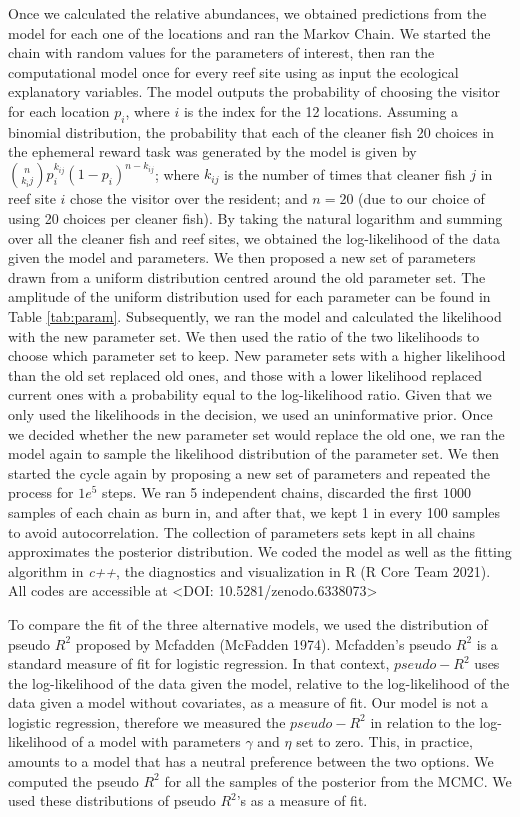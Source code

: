 \documentclass[
  12pt,
]{article}
\begin{document}
Once we calculated the relative abundances, we obtained predictions from
the model for each one of the locations and ran the Markov Chain. We
started the chain with random values for the parameters of interest,
then ran the computational model once for every reef site using as input
the ecological explanatory variables. The model outputs the probability
of choosing the visitor for each location \(p_i\), where \(i\) is the
index for the 12 locations. Assuming a binomial distribution, the
probability that each of the cleaner fish 20 choices in the ephemeral
reward task was generated by the model is given by
\(\binom{n}{k_ij}p^{k_{ij}}_i (1-p_i)^{n-k_{ij}}\); where \(k_{ij}\) is
the number of times that cleaner fish \(j\) in reef site \(i\) chose the
visitor over the resident; and \(n=20\) (due to our choice of using 20
choices per cleaner fish). By taking the natural logarithm and summing
over all the cleaner fish and reef sites, we obtained the log-likelihood
of the data given the model and parameters. We then proposed a new set
of parameters drawn from a uniform distribution centred around the old
parameter set. The amplitude of the uniform distribution used for each
parameter can be found in Table \ref{tab:param}. Subsequently, we ran
the model and calculated the likelihood with the new parameter set. We
then used the ratio of the two likelihoods to choose which parameter set
to keep. New parameter sets with a higher likelihood than the old set
replaced old ones, and those with a lower likelihood replaced current
ones with a probability equal to the log-likelihood ratio. Given that we
only used the likelihoods in the decision, we used an uninformative
prior. Once we decided whether the new parameter set would replace the
old one, we ran the model again to sample the likelihood distribution of
the parameter set. We then started the cycle again by proposing a new
set of parameters and repeated the process for \(1e^5\) steps. We ran 5
independent chains, discarded the first \(1000\) samples of each chain
as burn in, and after that, we kept 1 in every 100 samples to avoid
autocorrelation. The collection of parameters sets kept in all chains
approximates the posterior distribution. We coded the model as well as
the fitting algorithm in \emph{c++}, the diagnostics and visualization
in R (R Core Team 2021). All codes are accessible at \textless DOI:
10.5281/zenodo.6338073\textgreater{}

To compare the fit of the three alternative models, we used the
distribution of pseudo \(R^2\) proposed by Mcfadden (McFadden 1974).
Mcfadden's pseudo \(R^2\) is a standard measure of fit for logistic
regression. In that context, \(pseudo-R^2\) uses the log-likelihood of
the data given the model, relative to the log-likelihood of the data
given a model without covariates, as a measure of fit. Our model is not
a logistic regression, therefore we measured the \(pseudo-R^2\) in
relation to the log-likelihood of a model with parameters \(\gamma\) and
\(\eta\) set to zero. This, in practice, amounts to a model that has a
neutral preference between the two options. We computed the pseudo
\(R^2\) for all the samples of the posterior from the MCMC. We used
these distributions of pseudo \(R^2\)'s as a measure of fit.
\end{document}
